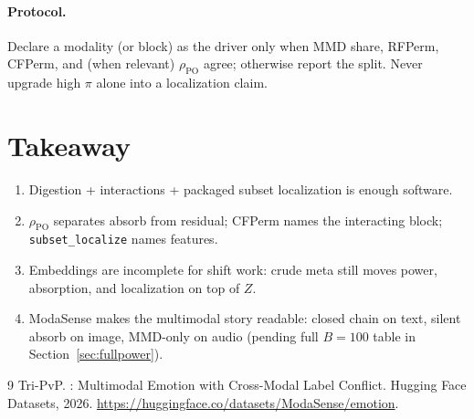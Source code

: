 \documentclass[11pt]{article}
\begin{document}
\paragraph{Protocol.}
Declare a modality (or block) as the driver only when MMD share, RFPerm,
CFPerm, and (when relevant) $\rho_{\mathrm{PO}}$ agree; otherwise report
the split.
Never upgrade high $\pi$ alone into a localization claim.

\section{Takeaway}
\begin{enumerate}[leftmargin=*]
  \item Digestion + interactions + packaged subset localization is enough
        software.
  \item $\rho_{\mathrm{PO}}$ separates absorb from residual; CFPerm names
        the interacting block; \texttt{subset\_localize} names features.
  \item Embeddings are incomplete for shift work: crude meta still moves
        power, absorption, and localization on top of $Z$.
  \item ModaSense makes the multimodal story readable: closed chain on
        text, silent absorb on image, MMD-only on audio (pending full
        $B{=}100$ table in Section~\ref{sec:fullpower}).
\end{enumerate}

\begin{thebibliography}{9}
Tri-PvP.
: Multimodal Emotion with Cross-Modal Label Conflict.
\newblock Hugging Face Datasets, 2026.
\newblock \url{https://huggingface.co/datasets/ModaSense/emotion}.
\end{thebibliography}
\end{document}
